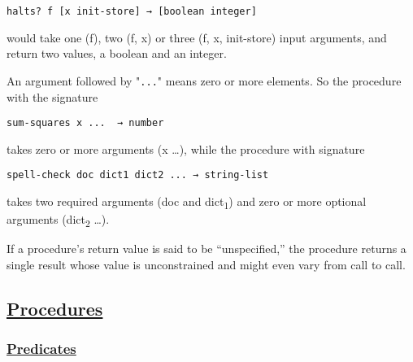 \begin{verbatim}
halts? f [x init-store] → [boolean integer]
\end{verbatim}

would take one (f), two (f, x) or three (f, x, init-store) input
arguments, and return two values, a boolean and an integer.

An argument followed by "\texttt{...}" means zero or more elements. So
the procedure with the signature

\begin{verbatim}
sum-squares x ...  → number
\end{verbatim}

takes zero or more arguments (x \ldots{}), while the procedure with
signature

\begin{verbatim}
spell-check doc dict1 dict2 ... → string-list
\end{verbatim}

takes two required arguments (doc and dict\textsubscript{1}) and zero or
more optional arguments (dict\textsubscript{2} \ldots{}).

If a procedure's return value is said to be ``unspecified,'' the
procedure returns a single result whose value is unconstrained and might
even vary from call to call.

\subsection{\texorpdfstring{\href{}{Procedures}}{Procedures}}\label{procedures}

\subsubsection{\texorpdfstring{\href{}{Predicates}}{Predicates}}\label{predicates}

